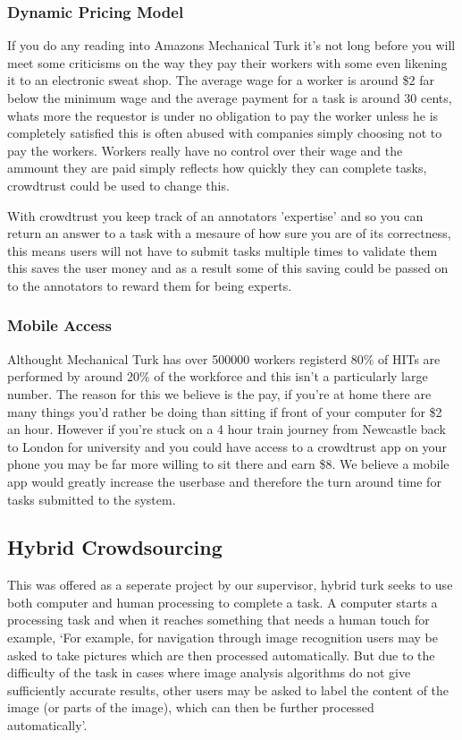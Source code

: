 \documentclass[11pt]{article}
\begin{document}
\subsubsection{Dynamic Pricing Model}
If you do any reading into Amazons Mechanical Turk it's not long before you will meet some criticisms on the way they pay their workers with some
even likening it to an electronic sweat shop. The average wage for a worker is around \$2 far below the minimum wage and the average payment for 
a task is around 30 cents, whats more the requestor is under no obligation to pay the worker unless he is completely satisfied this is often abused
with companies simply choosing not to pay the workers. Workers really have no control over their wage and the ammount they are paid simply 
reflects how quickly they can complete tasks, crowdtrust could be used to change this.

With crowdtrust you keep track of an annotators 'expertise' and so you can return an answer to a task with a mesaure of how sure you are of its
correctness, this means users will not have to submit tasks multiple times to validate them this saves the user money and as a result some of this
saving could be passed on to the annotators to reward them for being experts.   

\subsubsection{Mobile Access}
Althought Mechanical Turk has over 500000 workers registerd 80\% of HITs are performed by around 20\% of the workforce and this isn't a 
particularly large number. The reason for this we believe is the pay, if you're at home there are many things you'd rather be doing than sitting
if front of your computer for \$2 an hour. However if you're stuck on a 4 hour train journey from Newcastle back to London for university and
you could have access to a crowdtrust app on your phone you may be far more willing to sit there and earn \$8. We believe a mobile app would 
greatly increase the userbase and therefore the turn around time for tasks submitted to the system. 

\subsection{Hybrid Crowdsourcing}
This was offered as a seperate project by our supervisor, hybrid turk seeks to use both computer and human processing to complete a task. A
computer starts a processing task and when it reaches something that needs a human touch for example, `For example, for navigation through image recognition users may be asked to take pictures which are then processed automatically. But due to the difficulty of the task in cases where image analysis algorithms do not give sufficiently accurate results, other users may be asked to label the content of the image (or parts of the image), which can then be further processed automatically'. 
\end{document}
